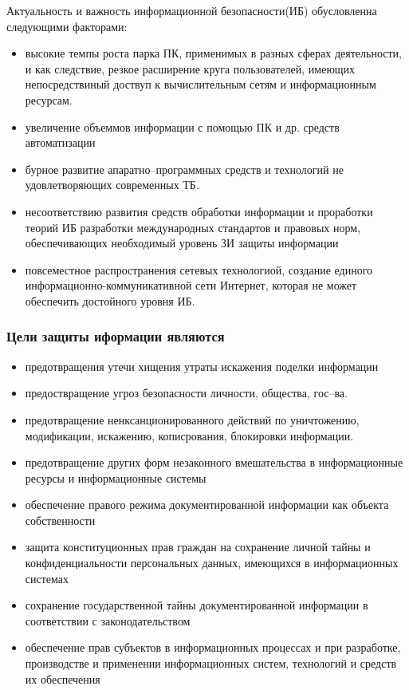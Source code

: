 \documentclass[a4paper,14pt]{extarticle}
\begin{document}
	Актуальность и важность информационной безопасности(ИБ) обусловленна следующими факторами:
	\begin{itemize}
		\item высокие темпы роста парка ПК, применимых в разных сферах деятельности, и как следствие, резкое расширение круга пользователей, имеющих непосредствиный доствуп к вычислительным сетям и информационным ресурсам.
		\item увеличение объеммов информации с помощью ПК и др. средств автоматизации
		\item бурное развитие апаратно--программных средств и технологий не удовлетворяющих современных ТБ.
		\item несоответствию развития средств обработки информации и проработки теорий ИБ разработки международных стандартов и правовых норм, обеспечивающих необходимый уровень ЗИ защиты информации
		\item  повсеместное распространения сетевых технологиой, создание единого информационно-коммуникативной сети Интернет, которая не может обеспечить достойного уровня ИБ.
	\end{itemize}

	\subsubsection*{Цели защиты иформации являются}
	\begin{itemize}
		\item предотвращения утечи хищения утраты искажения поделки информации
		\item  предоствращение угроз безопасности личности, общества, гос--ва.
		\item предотвращение ненксанционированного действий по уничтожению, модификации, искажению, кописрования, блокировки информации.
		\item  предотвращение других форм незаконного вмешательства в информационные ресурсы и информационные системы
		\item  обеспечение правого режима документированной информации как объекта собственности
		\item защита конституционных прав граждан на сохранение личной тайны и конфиденциальности персональных данных, имеющихся в информационных системах
		\item сохранение государственной тайны документированной информации в соответствии с законодательством
		\item обеспечение прав субъектов в информационных процессах и при разработке, производстве и применении информационных систем, технологий и средств их обеспечения
	\end{itemize}
\end{document}
